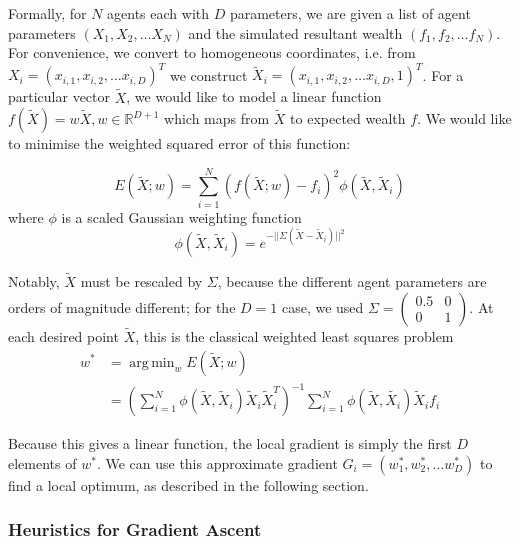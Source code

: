 \documentclass[11pt]{article}
\DeclareMathOperator*{\argmin}{arg\,min}
\begin{document}
Formally, for $N$ agents each with $D$ parameters, we are given a list of agent parameters $(X_1, X_2, \ldots X_N)$ and the simulated resultant wealth $(f_1, f_2, \ldots f_N)$. For convenience, we convert to homogeneous coordinates, i.e. from $X_i = (x_{i,1}, x_{i,2}, \ldots x_{i,D})^T$ we construct $\tilde{X}_i = (x_{i,1}, x_{i,2}, \ldots x_{i,D},  1)^T$. For a particular vector $\tilde{X}$, we would like to model a linear function $f(\tilde{X}) = w \tilde{X}, w \in \mathbb{R}^{D+1}$ which maps from $\tilde{X}$ to expected wealth $f$. We would like to minimise the weighted squared error of this function:

\begin{equation}
E(\tilde{X}; w) = \sum_{i=1}^N (f(\tilde{X}; w) - f_i)^2 \phi(\tilde{X}, \tilde{X}_i)
\end{equation}
where $\phi$ is a scaled Gaussian weighting function
\begin{equation}
\phi(\tilde{X}, \tilde{X}_i) = e^{-||\Sigma (\tilde{X}-\tilde{X}_i)||^2}
\end{equation}

Notably, $\tilde{X}$ must be rescaled by $\Sigma$, because the different agent parameters are orders of magnitude different; for the $D=1$ case, we used $\Sigma = \left( \begin{smallmatrix} 0.5&0\\0&1 \end{smallmatrix} \right) $. At each desired point $\tilde{X}$, this is the classical weighted least squares problem
\begin{align}
w^{*} &= \argmin_w E(\tilde{X}; w) \\
 &= \left( \sum_{i=1}^N \phi(\tilde{X},\tilde{X}_i) \tilde{X}_i \tilde{X}_i^T \right)^{-1} \sum_{i=1}^N \phi({\tilde{X}, \tilde{X_i}}) \tilde{X}_i f_i
\end{align}

Because this gives a linear function, the local gradient is simply the first $D$ elements of $w^*$. We can use this approximate gradient $G_i = (w^*_1, w^*_2, \ldots w^*_D)$ to find a local optimum, as described in the following section.

\subsubsection{Heuristics for Gradient Ascent}
\end{document}
